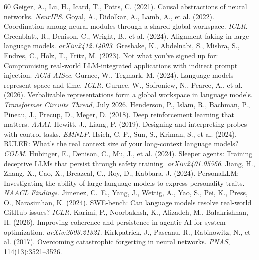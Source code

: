 \documentclass{article}
\begin{document}
\begin{thebibliography}{60}
 Geiger, A., Lu, H., Icard, T., Potts, C. (2021). Causal abstractions of neural networks. \emph{NeurIPS}.
 Goyal, A., Didolkar, A., Lamb, A., et al. (2022). Coordination among neural modules through a shared global workspace. \emph{ICLR}.
 Greenblatt, R., Denison, C., Wright, B., et al. (2024). Alignment faking in large language models. \emph{arXiv:2412.14093}.
 Greshake, K., Abdelnabi, S., Mishra, S., Endres, C., Holz, T., Fritz, M. (2023). Not what you've signed up for: Compromising real-world LLM-integrated applications with indirect prompt injection. \emph{ACM AISec}.
 Gurnee, W., Tegmark, M. (2024). Language models represent space and time. \emph{ICLR}.
 Gurnee, W., Sofroniew, N., Pearce, A., et al. (2026). Verbalizable representations form a global workspace in language models. \emph{Transformer Circuits Thread}, July 2026.
 Henderson, P., Islam, R., Bachman, P., Pineau, J., Precup, D., Meger, D. (2018). Deep reinforcement learning that matters. \emph{AAAI}.
 Hewitt, J., Liang, P. (2019). Designing and interpreting probes with control tasks. \emph{EMNLP}.
 Hsieh, C.-P., Sun, S., Kriman, S., et al. (2024). RULER: What's the real context size of your long-context language models? \emph{COLM}.
 Hubinger, E., Denison, C., Mu, J., et al. (2024). Sleeper agents: Training deceptive LLMs that persist through safety training. \emph{arXiv:2401.05566}.
 Jiang, H., Zhang, X., Cao, X., Breazeal, C., Roy, D., Kabbara, J. (2024). PersonaLLM: Investigating the ability of large language models to express personality traits. \emph{NAACL Findings}.
 Jimenez, C.~E., Yang, J., Wettig, A., Yao, S., Pei, K., Press, O., Narasimhan, K. (2024). SWE-bench: Can language models resolve real-world GitHub issues? \emph{ICLR}.
 Karimi, P., Noorbakhsh, K., Alizadeh, M., Balakrishnan, H. (2026). Improving coherence and persistence in agentic AI for system optimization. \emph{arXiv:2603.21321}.
 Kirkpatrick, J., Pascanu, R., Rabinowitz, N., et al. (2017). Overcoming catastrophic forgetting in neural networks. \emph{PNAS}, 114(13):3521--3526.

\end{thebibliography}
\end{document}
